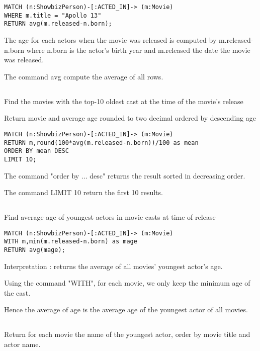 \begin{verbatim}
MATCH (n:ShowbizPerson)-[:ACTED_IN]-> (m:Movie)
WHERE m.title = "Apollo 13"
RETURN avg(m.released-n.born);
\end{verbatim}

The age for each actors when the movie was released is computed by m.released-n.born where n.born is the actor's birth year and m.released the date the movie was released.

The command avg compute the average of all rows.

\subsection{}
Find the movies with the top-10 oldest cast at the time of the movie’s release

Return movie and average age rounded to two decimal ordered by descending age

\begin{verbatim}
MATCH (n:ShowbizPerson)-[:ACTED_IN]-> (m:Movie)
RETURN m,round(100*avg(m.released-n.born))/100 as mean
ORDER BY mean DESC
LIMIT 10;
\end{verbatim}

The command "order by ... desc" returns the result sorted in decreasing order.

The command LIMIT 10 return the first 10 results.

\subsection{}
Find average age of youngest actors in movie casts at time of release

\begin{verbatim}
MATCH (n:ShowbizPerson)-[:ACTED_IN]-> (m:Movie)
WITH m,min(m.released-n.born) as mage
RETURN avg(mage);
\end{verbatim}

Interpretation : returns the average of all movies' youngest actor's age.

Using the command "WITH", for each movie, we only keep the minimum age of the cast.

Hence the average of age is the average age of the youngest actor of all movies.

\subsection{}
Return for each movie the name of the youngest actor, order by movie title and actor name.

